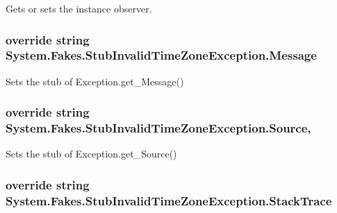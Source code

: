 Gets or sets the instance observer.

\hypertarget{class_system_1_1_fakes_1_1_stub_invalid_time_zone_exception_a53284d56fd5b32814f01f544e061d2d8}{
\subsubsection[{Message}]{\setlength{\rightskip}{0pt plus 5cm}override string System.\-Fakes.\-Stub\-Invalid\-Time\-Zone\-Exception.\-Message\hspace{0.3cm}{\ttfamily [get]}}}\label{class_system_1_1_fakes_1_1_stub_invalid_time_zone_exception_a53284d56fd5b32814f01f544e061d2d8}


Sets the stub of Exception.\-get\-\_\-\-Message()

\hypertarget{class_system_1_1_fakes_1_1_stub_invalid_time_zone_exception_af06d914f5a5e529fef21f9e656b0b2ab}{
\subsubsection[{Source}]{\setlength{\rightskip}{0pt plus 5cm}override string System.\-Fakes.\-Stub\-Invalid\-Time\-Zone\-Exception.\-Source\hspace{0.3cm}{\ttfamily [get]}, {\ttfamily [set]}}}\label{class_system_1_1_fakes_1_1_stub_invalid_time_zone_exception_af06d914f5a5e529fef21f9e656b0b2ab}


Sets the stub of Exception.\-get\-\_\-\-Source()

\hypertarget{class_system_1_1_fakes_1_1_stub_invalid_time_zone_exception_abcdac2cc2f58f34a302932a7b7ac90a9}{
\subsubsection[{Stack\-Trace}]{\setlength{\rightskip}{0pt plus 5cm}override string System.\-Fakes.\-Stub\-Invalid\-Time\-Zone\-Exception.\-Stack\-Trace\hspace{0.3cm}{\ttfamily [get]}}}\label{class_system_1_1_fakes_1_1_stub_invalid_time_zone_exception_abcdac2cc2f58f34a302932a7b7ac90a9}


